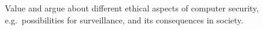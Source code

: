 \item Value and argue about different ethical aspects of computer security, 
e.g.\ possibilities for surveillance, and its consequences in society.
